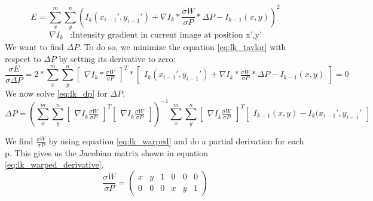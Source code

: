 \documentclass[11pt,a4paper,titlepage,oneside]{report}
\begin{document}
\begin{equation}\label{eq:lk_taylor}
  E=\sum_x^m\sum_y^n(I_{k}(x_{i-1}',y_{i-1}')+\nabla I_{k}*\frac{\sigma W}{\sigma P}*\Delta P-I_{k-1}(x,y))^2
\end{equation}
\begin{align*}
  \nabla I_k  &:  \text{Intensity gradient in current image at position x',y'}
\end{align*}
We want to find $\Delta P$. To do so, we minimize the equation \ref{eq:lk_taylor} with respect to $\Delta P$ by setting its derivative to zero:
\begin{equation}
  \frac{\sigma E}{\sigma \Delta P}=2*\sum_x^m\sum_y^n\begin{bmatrix}\nabla I_{k}*\frac{\sigma W}{\sigma P}\end{bmatrix}^T*\begin{bmatrix}I_{k}(x_{i-1}',y_{i-1}')+\nabla I_{k}*\frac{\sigma W}{\sigma P}*\Delta P-I_{k-1}(x,y)\end{bmatrix}=0
\end{equation}
We now solve \ref{eq:lk_dp} for $\Delta P$.
\tiny
\begin{equation}\label{eq:lk_dp}
  \Delta P=(\sum_x^m\sum_y^n\begin{bmatrix}\nabla I_{k}\frac{\sigma W}{\sigma P}\end{bmatrix}^T\begin{bmatrix}\nabla I_{k}\frac{\sigma W}{\sigma P}\end{bmatrix})^{-1}
  \sum_x^m\sum_y^n\begin{bmatrix}\nabla I_{k}\frac{\sigma W}{\sigma P}\end{bmatrix}^T\begin{bmatrix}I_{k-1}(x,y) - I_{k}(x_{i-1}',y_{i-1}'\end{bmatrix}
\end{equation}
\normalsize

We find $\frac{\sigma W}{\sigma P}$ by using equation \ref{eq:lk_warped} and do a partial derivation for each p. This gives us the Jacobian matrix shown in equation \ref{eq:lk_warped_derivative}.
\begin{equation}\label{eq:lk_warped_derivative}
  \frac{\sigma W}{\sigma P}=
  \begin{pmatrix}
    x & y & 1 & 0 & 0 & 0 \\
    0 & 0 & 0 & x & y & 1
  \end{pmatrix}
\end{equation}
\end{document}
